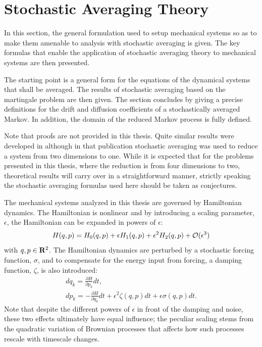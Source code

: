 
\section{Stochastic Averaging Theory}
\label{s:stochatic averaging theory}

In this section, the general formulation used to setup mechanical systems so as to make them amenable to analysis with stochastic averaging is given. The key formulas that enable the application of stochastic averaging theory to mechanical systems are then presented.

The starting point is a general form for the equations of the dynamical systems that shall be averaged. The results of stochastic averaging based on the martingale problem are then given. The section concludes by giving a precise definitions for the drift and diffusion coefficients of a stochastically averaged Markov. In addition, the domain of the reduced Markov process is fully defined.

Note that proofs are not provided in this thesis. Quite similar results were developed in \citet{namachchivaya01:_unified_approac_noisy_nonlin_mathieu_type_system} although in that publication stochastic averaging was used to reduce a system from two dimensions to one. While it is expected that for the problems presented in this thesis, where the reduction is from four dimensions to two, theoretical results will carry over in a straightforward manner, strictly speaking the stochastic averaging formulas used here should be taken as conjectures.

The mechanical systems analyzed in this thesis are governed by Hamiltonian dynamics. The Hamiltonian is nonlinear and by introducing a scaling parameter, $\epsilon$, the Hamiltonian can be expanded in powers of $\epsilon$:
\begin{equation}
\label{e:hamiltonian}
H(q,p) = H_0(q,p) + \epsilon H_1(q,p) + \epsilon^2 H_2(q,p) + \mathcal O(\epsilon^3)
\end{equation}
with $q,p \in \mathbf R^2$. The Hamiltonian dynamics are perturbed by a stochastic forcing function, $\sigma$, and to compensate for the energy input from forcing, a damping function, $\zeta$, is also introduced:
\begin{gather*}
dq_k = \frac{\partial H}{\partial p_k} dt,\\
dp_k = -\frac{\partial H}{\partial q_k} dt + \epsilon^2 \zeta(q,p) dt + \epsilon \sigma(q,p) dt.
\end{gather*}
Note that despite the different powers of $\epsilon$ in front of the damping and noise, these two effects ultimately have equal influence; the peculiar scaling stems from the quadratic variation of Brownian processes that affects how such processes rescale with timescale changes.

